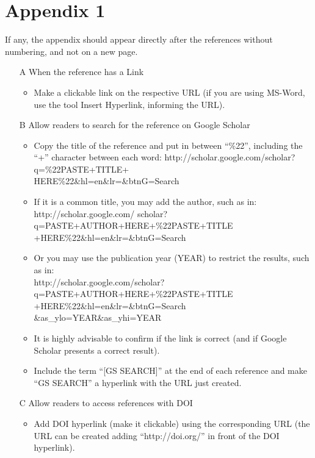 \documentclass[english, spanish, brazilian]{RBIEarticle} %
\begin{document}

\printbibliography


 \section*{Appendix 1}
\label{apendice1}

If any, the appendix should appear directly after the references without numbering, and not on a new page.

\begin{enumerate}
    \item[A] When the reference has a Link
    \begin{itemize}
        \item Make a clickable link on the respective URL (if you are using MS-Word, use the tool Insert Hyperlink, informing the URL).
    \end{itemize}
    \item[B] Allow readers to search for the reference on Google Scholar
    \begin{itemize}
        \item Copy the title of the reference and put in between ``\%22'', including the ``+'' character between each word: http://scholar.google.com/scholar?q=\%22PASTE+TITLE+\\HERE\%22\&hl=en\&lr=\&btnG=Search
        \item If it is a common title, you may add the author, such as in: \\http://scholar.google.com/ scholar?q=PASTE+AUTHOR+HERE+\%22PASTE+TITLE\\+HERE\%22\&hl=en\&lr=\&btnG=Search
        \item Or you may use the publication year (YEAR) to restrict the results, such as in:\\ http://scholar.google.com/scholar?
        q=PASTE+AUTHOR+HERE+\%22PASTE+TITLE\\+HERE\%22\&hl=en\&lr=\&btnG=Search \&as\_ylo=YEAR\&as\_yhi=YEAR
        \item It is highly advisable to confirm if the link is correct (and if Google Scholar presents a correct result).
        \item Include the term ``[GS SEARCH]'' at the end of each reference and make “GS SEARCH” a hyperlink with the URL just created.
    \end{itemize}
    \item[C] Allow readers to access references with DOI
    \begin{itemize}
        \item Add DOI hyperlink (make it clickable) using the corresponding URL (the URL can be created adding ``http://doi.org/'' in front of the DOI hyperlink).
    \end{itemize}
\end{enumerate}
\end{document}
